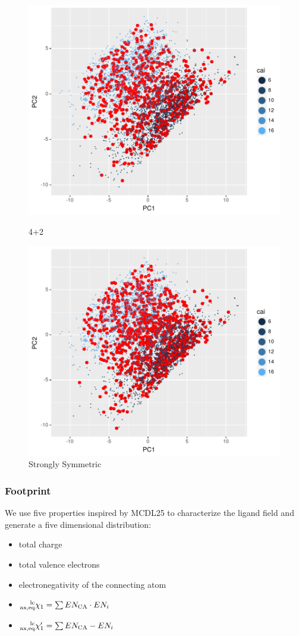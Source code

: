 \documentclass[xcolor=dvipsnames]{beamer}
\begin{document}
\begin{frame}
\begin{figure}[ht]
	\begin{minipage}[b]{0.5\linewidth}
			\centering
			\includegraphics[width=.5\linewidth]{img/pca_rf39_FtIntoSU_cai_span.pdf} 
			\caption{4+2}
		\end{minipage}%
		\begin{minipage}[b]{0.5\linewidth}
			\centering
			\includegraphics[width=.5\linewidth]{img/pca_rf39_SsIntoSU_cai_span.pdf} 
			\caption{Strongly Symmetric}
		\end{minipage} 
\end{figure}

\end{frame}

\begin{frame}
	\frametitle{Footprint}
	We use five properties inspired by MCDL25 to characterize the ligand field and generate a five dimensional distribution:\\
	\begin{itemize}
	\item total charge
	\item total valence electrons
	\item electronegativity of the connecting atom
	\item $\prescript{\textrm{lc}}{\textrm{ax,eq}}{\chi}_1 = \sum{EN_{\textrm{CA}} \cdot EN_i}$
	\item $\prescript{\textrm{lc}}{\textrm{ax,eq}}{\chi}^{\prime}_1 = \sum{EN_{\textrm{CA}} - EN_i}$
	\end{itemize}
\end{frame}
\end{document}
